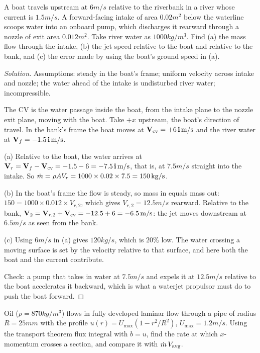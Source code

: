 \begin{example}
A boat travels upstream at $6\unit{m/s}$ relative to the riverbank in a river whose current is $1.5\unit{m/s}$. A forward-facing intake of area $0.02\unit{m^2}$ below the waterline scoops water into an onboard pump, which discharges it rearward through a nozzle of exit area $0.012\unit{m^2}$. Take river water as $1000\unit{kg/m^3}$. Find (a) the mass flow through the intake, (b) the jet speed relative to the boat and relative to the bank, and (c) the error made by using the boat's ground speed in (a).
\end{example}

\begin{proof}[Solution]
Assumptions: steady in the boat's frame; uniform velocity across intake and nozzle; the water ahead of the intake is undisturbed river water; incompressible.

The CV is the water passage inside the boat, from the intake plane to the nozzle exit plane, moving with the boat. Take $+x$ upstream, the boat's direction of travel. In the bank's frame the boat moves at $\mathbf{V}_\text{cv} = +6\,\mathbf{i}\,\mathrm{m/s}$ and the river water at $\mathbf{V}_f = -1.5\,\mathbf{i}\,\mathrm{m/s}$.

(a) Relative to the boat, the water arrives at $\mathbf{V}_r = \mathbf{V}_f - \mathbf{V}_\text{cv} = -1.5 - 6 = -7.5\,\mathbf{i}\,\mathrm{m/s}$, that is, at $7.5\unit{m/s}$ straight into the intake. So $\dot m = \rho A V_r = 1000 \times 0.02\times 7.5 = 150\,\mathrm{kg/s}$.

(b) In the boat's frame the flow is steady, so mass in equals mass out: $150 = 1000 \times 0.012 \times V_{r,2}$, which gives $V_{r,2} = 12.5\unit{m/s}$ rearward. Relative to the bank, $\mathbf{V}_2 = \mathbf{V}_{r,2} + \mathbf{V}_\text{cv} = -12.5 + 6 = -6.5\,\mathrm{m/s}$: the jet moves downstream at $6.5\unit{m/s}$ as seen from the bank.

(c) Using $6\unit{m/s}$ in (a) gives $120\unit{kg/s}$, which is $20\%$ low. The water crossing a moving surface is set by the velocity relative to that surface, and here both the boat and the current contribute.

Check: a pump that takes in water at $7.5\unit{m/s}$ and expels it at $12.5\unit{m/s}$ relative to the boat accelerates it backward, which is what a waterjet propulsor must do to push the boat forward.
\end{proof}

\begin{example}
Oil ($\rho = 870\unit{kg/m^3}$) flows in fully developed laminar flow through a pipe of radius $R = 25\unit{mm}$ with the profile $u(r) = U_\text{max}(1 - r^2/R^2)$, $U_\text{max} = 1.2\unit{m/s}$. Using the transport theorem flux integral with $b = u$, find the rate at which $x$-momentum crosses a section, and compare it with $\dot m\,V_\text{avg}$.
\end{example}

